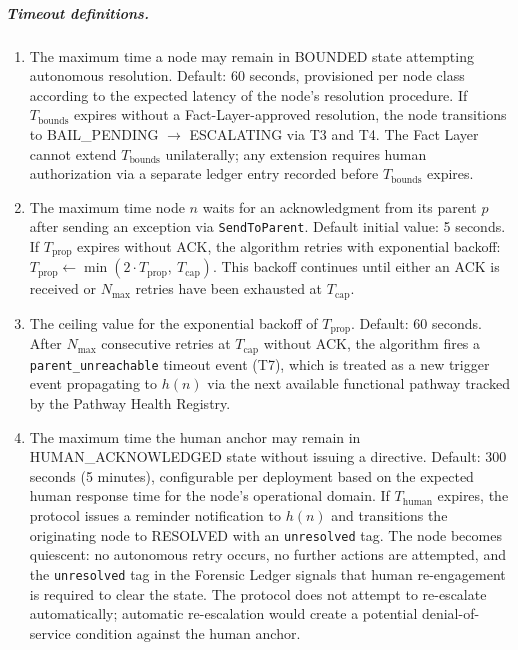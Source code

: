 \subparagraph{Timeout definitions.}

\begin{enumerate}
\item[\textbf{$T_{\text{bounds}}$ — Bounds Engine resolution timeout.}] The maximum time a node may remain in BOUNDED state attempting autonomous resolution. Default: 60 seconds, provisioned per node class according to the expected latency of the node's resolution procedure. If $T_{\text{bounds}}$ expires without a Fact-Layer-approved resolution, the node transitions to BAIL\_PENDING $\rightarrow$ ESCALATING via T3 and T4. The Fact Layer cannot extend $T_{\text{bounds}}$ unilaterally; any extension requires human authorization via a separate ledger entry recorded before $T_{\text{bounds}}$ expires.

\item[\textbf{$T_{\text{prop}}$ — Per-hop propagation timeout.}] The maximum time node $n$ waits for an acknowledgment from its parent $p$ after sending an exception via \texttt{SendToParent}. Default initial value: 5 seconds. If $T_{\text{prop}}$ expires without ACK, the algorithm retries with exponential backoff: $T_{\text{prop}} \leftarrow \min(2 \cdot T_{\text{prop}},\ T_{\text{cap}})$. This backoff continues until either an ACK is received or $N_{\max}$ retries have been exhausted at $T_{\text{cap}}$.

\item[\textbf{$T_{\text{cap}}$ — Maximum propagation timeout value.}] The ceiling value for the exponential backoff of $T_{\text{prop}}$. Default: 60 seconds. After $N_{\max}$ consecutive retries at $T_{\text{cap}}$ without ACK, the algorithm fires a \texttt{parent\_unreachable} timeout event (T7), which is treated as a new trigger event propagating to $h(n)$ via the next available functional pathway tracked by the Pathway Health Registry.

\item[\textbf{$T_{\text{human}}$ — Human acknowledgment timeout.}] The maximum time the human anchor may remain in HUMAN\_ACKNOWLEDGED state without issuing a directive. Default: 300 seconds (5 minutes), configurable per deployment based on the expected human response time for the node's operational domain. If $T_{\text{human}}$ expires, the protocol issues a reminder notification to $h(n)$ and transitions the originating node to RESOLVED with an \texttt{unresolved} tag. The node becomes quiescent: no autonomous retry occurs, no further actions are attempted, and the \texttt{unresolved} tag in the Forensic Ledger signals that human re-engagement is required to clear the state. The protocol does not attempt to re-escalate automatically; automatic re-escalation would create a potential denial-of-service condition against the human anchor.
\end{enumerate}

